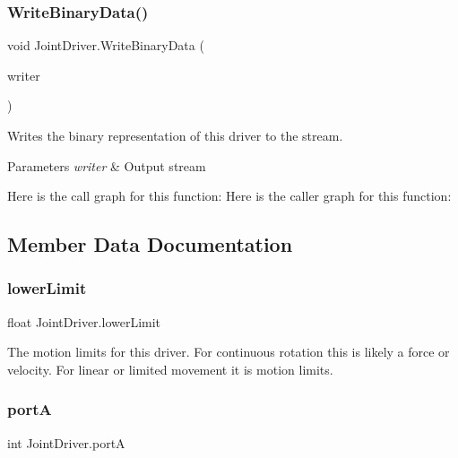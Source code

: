 \subsubsection{\texorpdfstring{Write\+Binary\+Data()}{WriteBinaryData()}}
{\footnotesize\ttfamily void Joint\+Driver.\+Write\+Binary\+Data (\begin{DoxyParamCaption}\item[{System.\+I\+O.\+Binary\+Writer}]{writer }\end{DoxyParamCaption})}



Writes the binary representation of this driver to the stream. 


\begin{DoxyParams}{Parameters}
{\em writer} & Output stream\\
\hline
\end{DoxyParams}
Here is the call graph for this function\+:
Here is the caller graph for this function\+:


\subsection{Member Data Documentation}
\mbox{\label{class_joint_driver_a251b0eb937cd1007497acf4cfb594fe0}} 
\subsubsection{\texorpdfstring{lower\+Limit}{lowerLimit}}
{\footnotesize\ttfamily float Joint\+Driver.\+lower\+Limit}



The motion limits for this driver. For continuous rotation this is likely a force or velocity. For linear or limited movement it is motion limits. 

\mbox{\label{class_joint_driver_a8bd27164aad80347972763dd56c5b311}} 
\subsubsection{\texorpdfstring{portA}{portA}}
{\footnotesize\ttfamily int Joint\+Driver.\+portA}



